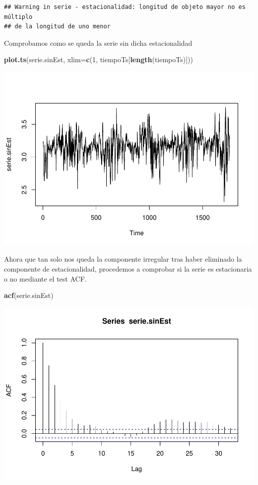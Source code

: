 \documentclass[]{article}
\newenvironment{Shaded}{\begin{snugshade}}{\end{snugshade}}
\newcommand{\KeywordTok}[1]{\textcolor[rgb]{0.13,0.29,0.53}{\textbf{#1}}}
\newcommand{\DataTypeTok}[1]{\textcolor[rgb]{0.13,0.29,0.53}{#1}}
\newcommand{\DecValTok}[1]{\textcolor[rgb]{0.00,0.00,0.81}{#1}}
\newcommand{\NormalTok}[1]{#1}
\begin{document}
\begin{verbatim}
## Warning in serie - estacionalidad: longitud de objeto mayor no es múltiplo
## de la longitud de uno menor
\end{verbatim}

Comprobamos como se queda la serie sin dicha estacionalidad

\begin{Shaded}
\begin{Highlighting}[]
\KeywordTok{plot.ts}\NormalTok{(serie.sinEst, }\DataTypeTok{xlim=}\KeywordTok{c}\NormalTok{(}\DecValTok{1}\NormalTok{, tiempoTs[}\KeywordTok{length}\NormalTok{(tiempoTs)]))}
\end{Highlighting}
\end{Shaded}

\includegraphics{exercise2_files/figure-latex/unnamed-chunk-22-1.pdf}

Ahora que tan solo nos queda la componente irregular tras haber
eliminado la componente de estacionalidad, procedemos a comprobar si la
serie es estacionaria o no mediante el test ACF.

\begin{Shaded}
\begin{Highlighting}[]
\KeywordTok{acf}\NormalTok{(serie.sinEst)}
\end{Highlighting}
\end{Shaded}

\includegraphics{exercise2_files/figure-latex/unnamed-chunk-23-1.pdf}
\end{document}
